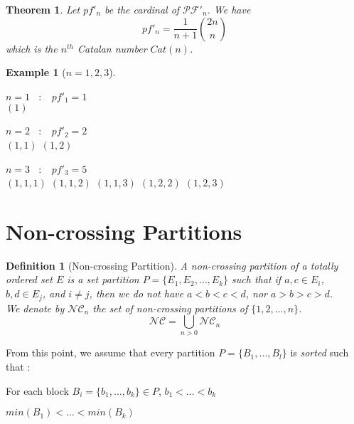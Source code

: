 \documentclass[12pt]{report}
\newtheorem{theorem}{Theorem}
\newtheorem{definition}{Definition}
\newtheorem*{example}{Example}
\begin{document}
\begin{theorem}
    Let $pf'_n$ be the cardinal of $\mathcal{PF'}_n$.
    We have $$pf'_n = \frac{1}{n + 1} \binom{2n}{n}$$
    which is the $n^{th}$ Catalan number $Cat(n)$.
\end{theorem}

\begin{example}[$n = 1, 2, 3$]
    ~\\
    \begin{itemize*}
        \item $n = 1$ \  $:$ \  $pf'_1 = 1$\\
        \subitem $(1)$\\
        \item $n = 2$ \  $:$ \  $pf'_2 = 2$\\
        \subitem $(1, 1)$
        \subitem $(1, 2)$\\
        \item $n = 3$ \  $:$ \  $pf'_3 = 5$\\
        \subitem $(1, 1, 1)$
        \subitem $(1, 1, 2)$
        \subitem $(1, 1, 3)$
        \subitem $(1, 2, 2)$
        \subitem $(1, 2, 3)$\\
    \end{itemize*}
\end{example}

\section{Non-crossing Partitions}

\begin{definition}[Non-crossing Partition]
    A \emph{non-crossing partition} of a \emph{totally
    ordered} set $E$ is
    a set partition $P = \{E_1, E_2, \ldots, E_k\}$ such that
    if $a, c \in E_i$, $b, d \in E_j$, and $i \neq j$, then
    we do \emph{not} have $a < b < c < d$, nor $a > b > c > d$.\\
    We denote by $\mathcal{NC}_n$ the set of non-crossing partitions
    of $\{1, 2, \ldots, n\}$.
    $$\mathcal{NC} = \bigcup_{n > 0}{\mathcal{NC}_n}$$
\end{definition}

From this point, we assume that every partition $P = \{B_1, \ldots, B_l\}$
is \emph{sorted} such that :\\
\begin{itemize*}
    \item For each block $B_i = \{b_1, \ldots, b_k\} \in P$,
        $b_1 < \ldots < b_k$\\
    \item $min (B_1) < \ldots < min (B_k)$\\
\end{itemize*}
\end{document}
